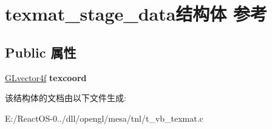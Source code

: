 \hypertarget{structtexmat__stage__data}{}\section{texmat\+\_\+stage\+\_\+data结构体 参考}
\label{structtexmat__stage__data}
\subsection*{Public 属性}
\begin{DoxyCompactItemize}
\item 
\mbox{\label{structtexmat__stage__data_ac624a243367e5c8305358f69076b14c8}} 
\hyperlink{struct_g_lvector4f}{G\+Lvector4f} {\bfseries texcoord}
\end{DoxyCompactItemize}


该结构体的文档由以下文件生成\+:\begin{DoxyCompactItemize}
\item 
E\+:/\+React\+O\+S-\/0../dll/opengl/mesa/tnl/t\+\_\+vb\+\_\+texmat.\+c\end{DoxyCompactItemize}
